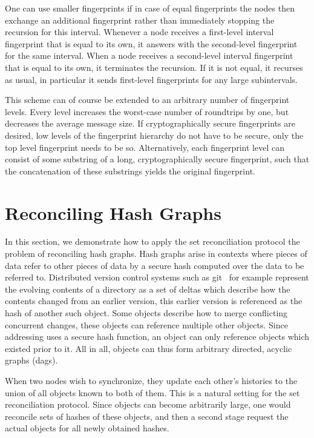 One can use smaller fingerprints if in case of equal fingerprints the nodes then exchange an additional fingerprint rather than immediately stopping the recursion for this interval. Whenever a node receives a first-level interval fingerprint that is equal to its own, it answers with the second-level fingerprint for the same interval. When a node receives a second-level interval fingerprint that is equal to its own, it terminates the recursion. If it is not equal, it recurses as usual, in particular it sends first-level fingerprints for any large subintervals.

This scheme can of course be extended to an arbitrary number of fingerprint levels. Every level increases the worst-case number of roundtrips by one, but decreases the average message size. If cryptographically secure fingerprints are desired, low levels of the fingerprint hierarchy do not have to be secure, only the top level fingerprint needs to be so. Alternatively, each fingerprint level can consist of some substring of a long, cryptographically secure fingerprint, such that the concatenation of these substrings yields the original fingerprint.

\section{Reconciling Hash Graphs}
\label{set-reconciliation-graphs}

In this section, we demonstrate how to apply the set reconciliation protocol the problem of reconciling hash graphs. Hash graphs arise in contexts where pieces of data refer to other pieces of data by a secure hash computed over the data to be referred to. Distributed version control systems such as git~\cite{chacon2014pro} for example represent the evolving contents of a directory as a set of deltas which describe how the contents changed from an earlier version, this earlier version is referenced as the hash of another such object. Some objects describe how to merge conflicting concurrent changes, these objects can reference multiple other objects. Since addressing uses a secure hash function, an object can only reference objects which existed prior to it. All in all, objects can thus form arbitrary directed, acyclic graphs (dags).

When two nodes wish to synchronize, they update each other's histories to the union of all objects known to both of them. This is a natural setting for the set reconciliation protocol. Since objects can become arbitrarily large, one would reconcile sets of hashes of these objects, and then a second stage request the actual objects for all newly obtained hashes.

